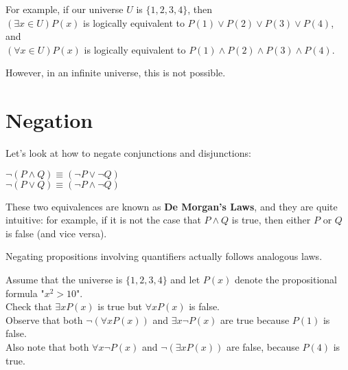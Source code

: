 \documentclass[12pt,a4paper]{article}
\begin{document}
For example, if our universe $U$ is $\{1,2,3,4\}$, then \\
$(\exists x \in U)P(x)$ is logically equivalent to $P(1)\vee P(2)\vee P(3)\vee P(4)$, and \\
$(\forall x \in U)P(x)$ is logically equivalent to $P(1)\wedge P(2) \wedge P(3) \wedge P(4)$.
 
\bigbreak
 
However, in an infinite universe, this is not possible.

\section*{Negation}

Let's look at how to negate conjunctions and disjunctions:
\begin{center}
 	$\neg(P\wedge Q)\equiv(\neg P\vee\neg Q)$ \\
 	$\neg(P\vee Q)\equiv(\neg P\wedge\neg Q)$
\end{center}

These two equivalences are known as \textbf{De Morgan's Laws}, and they are quite intuitive: for example, if it is not the case that $P\wedge Q$ is true, then either $P$ or $Q$ is false (and vice versa).

\bigbreak

Negating propositions involving quantifiers actually follows analogous laws.

\bigbreak
Assume that the universe is $\{1,2,3,4\}$ and let $P(x)$ denote the propositional formula "$x^2>10$". \\
Check that $\exists xP(x)$ is true but $\forall xP(x)$ is false. \\
Observe that both $\neg(\forall xP(x))$ and $\exists x\neg P(x)$ are true because $P(1)$ is false. \\
Also note that both $\forall x\neg P(x)$ and $\neg(\exists xP(x))$ are false, because $P(4)$ is true.
\end{document}
